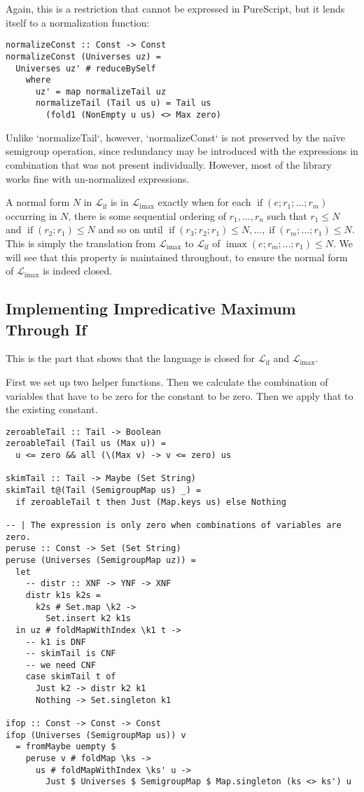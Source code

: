 \documentclass[11pt, twoside, reqno]{book}
\DeclareMathOperator{\imax}{imax}
\DeclareMathOperator{\ifop}{if}
\begin{document}
Again, this is a restriction that cannot be expressed in PureScript, but it lends itself to a normalization function:
\begin{verbatim}
normalizeConst :: Const -> Const
normalizeConst (Universes uz) =
  Universes uz' # reduceBySelf
    where
      uz' = map normalizeTail uz
      normalizeTail (Tail us u) = Tail us
        (fold1 (NonEmpty u us) <> Max zero)
\end{verbatim}
Unlike \inHS`normalizeTail`, however, \inHS`normalizeConst` is not preserved by the na\"ive semigroup operation, since redundancy may be introduced with the expressions in combination that was not present individually.
However, most of the library works fine with un-normalized expressions.

A normal form \(N\) in \(\mathcal{L}_{\ifop}\) is in \(\mathcal{L}_{\imax}\) exactly when for each \(\ifop(e; r_1; \dots; r_m)\) occurring in \(N\), there is some sequential ordering of \(r_1, \dots, r_n\) such that \(r_1 \le N\) and \(\ifop(r_2; r_1) \le N\) and so on until \(\ifop(r_3; r_2; r_1) \le N, \dots, \ifop(r_m; \dots; r_1) \le N\).
This is simply the translation from \(\mathcal{L}_{\imax}\) to \(\mathcal{L}_{\ifop}\) of \(\imax(e; r_m; \dots; r_1) \le N\).
We will see that this property is maintained throughout, to ensure the normal form of \(\mathcal{L}_{\imax}\) is indeed closed.

\subsection{Implementing Impredicative Maximum Through If}
This is the part that shows that the language is closed for \(\mathcal{L}_{\ifop}\) and \(\mathcal{L}_{\imax}\).

First we set up two helper functions.
Then we calculate the combination of variables that have to be zero for the constant to be zero.
Then we apply that to the existing constant.

\begin{verbatim}
zeroableTail :: Tail -> Boolean
zeroableTail (Tail us (Max u)) =
  u <= zero && all (\(Max v) -> v <= zero) us

skimTail :: Tail -> Maybe (Set String)
skimTail t@(Tail (SemigroupMap us) _) =
  if zeroableTail t then Just (Map.keys us) else Nothing

-- | The expression is only zero when combinations of variables are zero.
peruse :: Const -> Set (Set String)
peruse (Universes (SemigroupMap uz)) =
  let
    -- distr :: XNF -> YNF -> XNF
    distr k1s k2s =
      k2s # Set.map \k2 ->
        Set.insert k2 k1s
  in uz # foldMapWithIndex \k1 t ->
    -- k1 is DNF
    -- skimTail is CNF
    -- we need CNF
    case skimTail t of
      Just k2 -> distr k2 k1
      Nothing -> Set.singleton k1

ifop :: Const -> Const -> Const
ifop (Universes (SemigroupMap us)) v
  = fromMaybe uempty $
    peruse v # foldMap \ks ->
      us # foldMapWithIndex \ks' u ->
        Just $ Universes $ SemigroupMap $ Map.singleton (ks <> ks') u
\end{verbatim}
\end{document}
